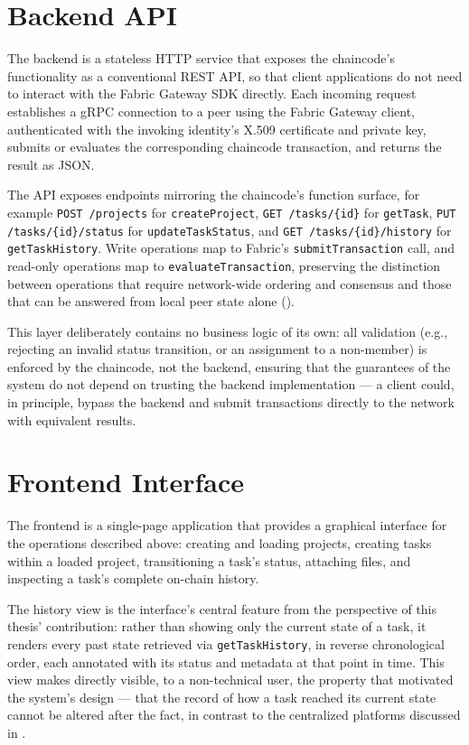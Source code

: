 \section{Backend API}
\label{sec:backend}

The backend is a stateless HTTP service that exposes the chaincode's functionality as a conventional REST API, so that client applications do not need to interact with the Fabric Gateway SDK directly. Each incoming request establishes a gRPC connection to a peer using the Fabric Gateway client, authenticated with the invoking identity's X.509 certificate and private key, submits or evaluates the corresponding chaincode transaction, and returns the result as JSON.

The API exposes endpoints mirroring the chaincode's function surface, for example \texttt{POST /projects} for \texttt{createProject}, \texttt{GET /tasks/\{id\}} for \texttt{getTask}, \texttt{PUT /tasks/\{id\}/status} for \texttt{updateTaskStatus}, and \texttt{GET /tasks/\{id\}/history} for \texttt{getTaskHistory}. Write operations map to Fabric's \texttt{submitTransaction} call, and read-only operations map to \texttt{evaluateTransaction}, preserving the distinction between operations that require network-wide ordering and consensus and those that can be answered from local peer state alone ().

This layer deliberately contains no business logic of its own: all validation (e.g., rejecting an invalid status transition, or an assignment to a non-member) is enforced by the chaincode, not the backend, ensuring that the guarantees of the system do not depend on trusting the backend implementation — a client could, in principle, bypass the backend and submit transactions directly to the network with equivalent results.

\section{Frontend Interface}
\label{sec:frontend}

The frontend is a single-page application that provides a graphical interface for the operations described above: creating and loading projects, creating tasks within a loaded project, transitioning a task's status, attaching files, and inspecting a task's complete on-chain history.

The history view is the interface's central feature from the perspective of this thesis' contribution: rather than showing only the current state of a task, it renders every past state retrieved via \texttt{getTaskHistory}, in reverse chronological order, each annotated with its status and metadata at that point in time. This view makes directly visible, to a non-technical user, the property that motivated the system's design — that the record of how a task reached its current state cannot be altered after the fact, in contrast to the centralized platforms discussed in .
